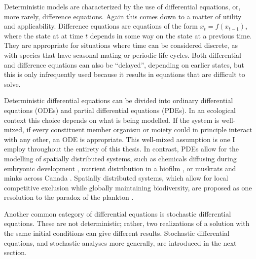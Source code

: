 Deterministic models are characterized by the use of differential equations, or, more rarely, difference equations. 
Again this comes down to a matter of utility and applicability. 
Difference equations are equations of the form $x_{t} = f(x_{t-1})$, where the state at at time $t$ depends in some way on the state at a previous time. 
They are appropriate for situations where time can be considered discrete, as with species that have seasonal mating or periodic life cycles. %
Both differential and difference equations can also be ``delayed'', depending on earlier states, but this is only infrequently used because it results in equations that are difficult to solve. 

Deterministic differential equations can be divided into ordinary differential equations (ODEs) and partial differential equations (PDEs). 
In an ecological context this choice depends on what is being modelled. 
If the system is well-mixed, if every constituent member organism or moiety could in principle interact with any other, an ODE is appropriate. 
This well-mixed assumption is one I employ throughout the entirety of this thesis. 
In contrast, PDEs allow for the modelling of spatially distributed systems, such as chemicals diffusing during embryonic development \cite{Houchmandzadeh2002}, nutrient distribution in a biofilm \cite{Bucci2011}, or muskrats and minks across Canada \cite{Haydon2001}. 
Spatially distributed systems, which allow for local competitive exclusion while globally maintaining biodiversity, are proposed as one resolution to the paradox of the plankton \cite{Chesson2000,Roy2007}. 

Another common category of differential equations is stochastic differential equations. 
These are not deterministic; rather, two realizations of a solution with the same initial conditions can give different results. 
Stochastic differential equations, and stochastic analyses more generally, are introduced in the next section. 


